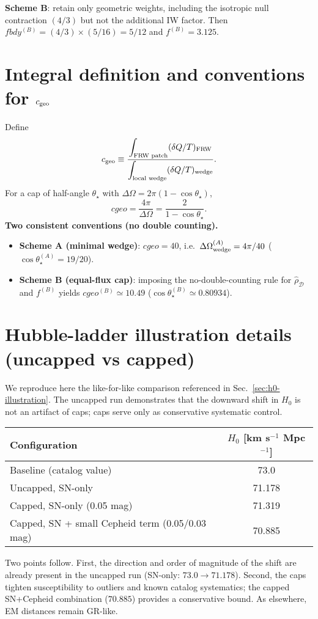 \documentclass[aps,prd,onecolumn,superscriptaddress,nofootinbib]{revtex4-2}
\def\cgeo{cgeo}%
\def\fbdy{fbdy}%
\def\boxed#1{#1}%
\newcommand{\cgeo}{c_{\rm geo}}
\newcommand{\fbdy}{f_{\rm bdy}}
\begin{document}
\textbf{Scheme B}: retain only geometric weights, including the isotropic null contraction $(4/3)$ but not the additional IW factor. Then $\fbdy^{(B)}=(4/3)\times (5/16)=5/12$ and $f^{(B)}=3.125$.

\section{Integral definition and conventions for \texorpdfstring{$c_{\rm geo}$}{cgeo}}
\label{app:cgeo-integral}
Define
\begin{equation}
c_{\rm geo} \equiv \frac{\displaystyle \int_{\text{FRW patch}} (\delta Q/T)_{\text{FRW}}}{\displaystyle \int_{\text{local wedge}} (\delta Q/T)_{\text{wedge}}}.
\label{eq:cgeo-def}
\end{equation}
For a cap of half-angle $\theta_\star$ with $\Delta\Omega=2\pi(1-\cos\theta_\star)$,
\begin{equation}
\cgeo = \frac{4\pi}{\Delta\Omega} = \frac{2}{1-\cos\theta_\star}.
\end{equation}
\textbf{Two consistent conventions (no double counting).}
\begin{itemize}[leftmargin=1.3em]
\item \textbf{Scheme A (minimal wedge)}: $\boxed{\cgeo=40}$, i.e.\ $\Delta\Omega_{\rm wedge}^{(A)}=4\pi/40$ ($\cos\theta_\star^{(A)}=19/20$).
\item \textbf{Scheme B (equal-flux cap)}: imposing the no-double-counting rule for $\hat\rho_{\mathcal D}$ and $f^{(B)}$ yields $\boxed{\cgeo^{(B)} \simeq 10.49}$ ($\cos\theta_\star^{(B)}\simeq 0.80934$).
\end{itemize}

\section{Hubble-ladder illustration details (uncapped vs capped)}
\label{app:h0-details}
We reproduce here the like-for-like comparison referenced in Sec.~\ref{sec:h0-illustration}. The uncapped run demonstrates that the downward shift in \(H_0\) is not an artifact of caps; caps serve only as conservative systematic control.
\begin{center}
\begin{tabular}{l|c}
\hline
Configuration & \(H_0\) [km s\(^{-1}\) Mpc\(^{-1}\)] \\
\hline
Baseline (catalog value) & 73.0 \\
Uncapped, SN-only & 71.178 \\
Capped, SN-only (0.05 mag) & 71.319 \\
Capped, SN + small Cepheid term (0.05/0.03 mag) & 70.885 \\
\hline
\end{tabular}
\end{center}
Two points follow. First, the direction and order of magnitude of the shift are already present in the uncapped run (SN-only: \(73.0 \to 71.178\)). Second, the caps tighten susceptibility to outliers and known catalog systematics; the capped SN+Cepheid combination (\(70.885\)) provides a conservative bound. As elsewhere, EM distances remain GR-like.
\end{document}
